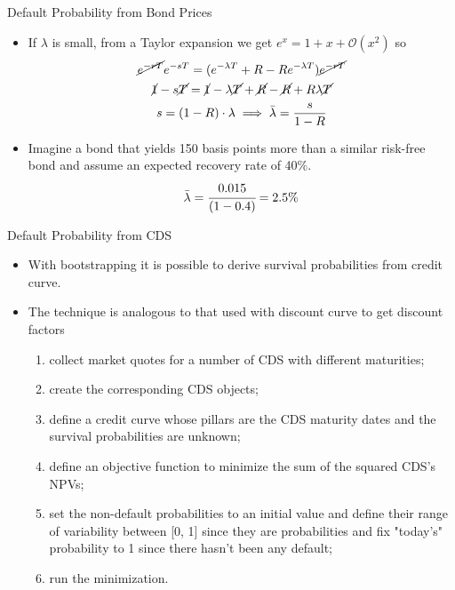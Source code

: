\documentclass{beamer}
\begin{document}
\begin{frame}{Default Probability from Bond Prices}
\begin{itemize}
\item If $\lambda$ is small, from a Taylor expansion we get $e^{x} = 1 + x + \mathcal{O}(x^2)$ so
\begin{equation*}
\begin{gathered}
\cancel{e^{-rT}}e^{-sT}= (e^{-\lambda T} + R - R e^{-\lambda T})\cancel{e^{-rT}} \\
\cancel{1} - s\cancel{T} = \cancel{1} - \lambda \cancel{T} + \cancel{R} - \cancel{R} + R\lambda \cancel{T} \\
s = (1 - R)\cdot \lambda \implies \bar{\lambda} = \frac{s}{1-R}
\end{gathered}
\end{equation*}
\item Imagine a bond that yields 150 basis points more than a similar risk-free bond and assume an expected recovery rate of 40\%.
\begin{equation*}
\bar{\lambda} = \cfrac{0.015}{(1-0.4)} = 2.5\%
\end{equation*}
\end{itemize}
\end{frame}

\begin{frame}{Default Probability from CDS}
\begin{itemize}
\item With bootstrapping it is possible to derive survival probabilities from credit curve.
\item The technique is analogous to that used with discount curve to get discount factors
\begin{enumerate}
\item collect market quotes for a number of CDS with different maturities;
\item create the corresponding CDS objects;
\item define a credit curve whose pillars are the CDS maturity dates and the survival probabilities are unknown;
\item define an objective function to minimize the sum of the squared CDS's NPVs;
\item set the non-default probabilities to an initial value and define their range of variability between [0, 1] since they are probabilities and fix "today's" probability to 1 since there hasn't been any default;
\item run the minimization.
\end{enumerate}
\end{itemize}
\end{frame}
\end{document}
